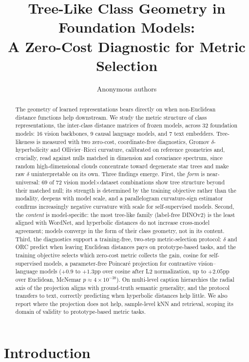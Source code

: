 \documentclass{article} %
\title{Tree-Like Class Geometry in Foundation Models: \\ A Zero-Cost Diagnostic for Metric Selection}
\author{Anonymous authors}
\begin{document}
\maketitle

\begin{abstract}
The geometry of learned representations bears directly on when non-Euclidean distance functions help downstream. We study the metric structure of class representations, the inter-class distance matrices of frozen models, across 32 foundation models: 16 vision backbones, 9 causal language models, and 7 text embedders. Tree-likeness is measured with two zero-cost, coordinate-free diagnostics, Gromov $\delta$-hyperbolicity and Ollivier--Ricci curvature, calibrated on reference geometries and, crucially, read against nulls matched in dimension and covariance spectrum, since random high-dimensional clouds concentrate toward degenerate star trees and make raw $\delta$ uninterpretable on its own. Three findings emerge. First, the \emph{form} is near-universal: 69 of 72 vision model$\times$dataset combinations show tree structure beyond their matched null; its strength is determined by the training objective rather than the modality, deepens with model scale, and a parallelogram curvature-sign estimator confirms increasingly negative curvature with scale for self-supervised models. Second, the \emph{content} is model-specific: the most tree-like family (label-free DINOv2) is the least aligned with WordNet, and hyperbolic distances do not increase cross-model agreement; models converge in the form of their class geometry, not in its content. Third, the diagnostics support a training-free, two-step metric-selection protocol: $\delta$ and ORC predict when leaving Euclidean distances pays on prototype-based tasks, and the training objective selects which zero-cost metric collects the gain, cosine for self-supervised models, a parameter-free Poincar\'{e} projection for contrastive vision--language models ($+0.9$ to $+1.3$pp over cosine after L2 normalization, up to $+2.05$pp over Euclidean, McNemar $p \approx 4\times10^{-38}$). On multi-level caption hierarchies the radial axis of the projection aligns with ground-truth semantic generality, and the protocol transfers to text, correctly predicting when hyperbolic distances help little. We also report where the projection does not help, sample-level kNN and retrieval, scoping its domain of validity to prototype-based metric tasks.
\end{abstract}

\section{Introduction}
\end{document}
